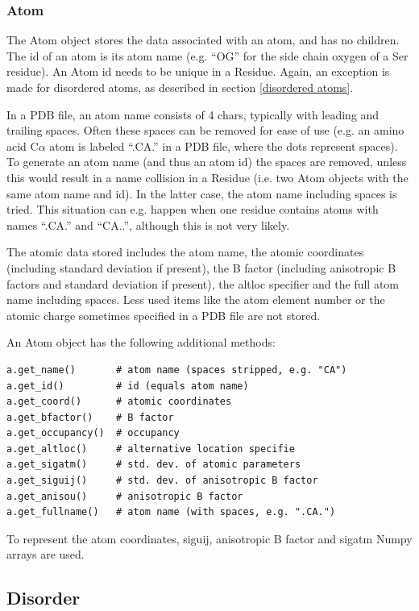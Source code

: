 \documentclass{report}
\begin{document}
\subsubsection{Atom}

The Atom object stores the data associated with an atom, and has no children.
The id of an atom is its atom name (e.g. {}``OG{}'' for the side chain oxygen
of a Ser residue). An Atom id needs to be unique in a Residue. Again, an exception
is made for disordered atoms, as described in section \ref{disordered atoms}.

In a PDB file, an atom name consists of 4 chars, typically with leading and
trailing spaces. Often these spaces can be removed for ease of use (e.g. an
amino acid C\( \alpha  \) atom is labeled {}``.CA.{}'' in a PDB file, where
the dots represent spaces). To generate an atom name (and thus an atom id) the
spaces are removed, unless this would result in a name collision in a Residue
(i.e. two Atom objects with the same atom name and id). In the latter case,
the atom name including spaces is tried. This situation can e.g. happen when
one residue contains atoms with names {}``.CA.{}'' and {}``CA..{}'', although
this is not very likely.

The atomic data stored includes the atom name, the atomic coordinates (including
standard deviation if present), the B factor (including anisotropic B factors
and standard deviation if present), the altloc specifier and the full atom name
including spaces. Less used items like the atom element number or the atomic
charge sometimes specified in a PDB file are not stored.

An Atom object has the following additional methods:

\begin{verbatim}
a.get_name()       # atom name (spaces stripped, e.g. "CA")
a.get_id()         # id (equals atom name)
a.get_coord()      # atomic coordinates
a.get_bfactor()    # B factor
a.get_occupancy()  # occupancy
a.get_altloc()     # alternative location specifie
a.get_sigatm()     # std. dev. of atomic parameters
a.get_siguij()     # std. dev. of anisotropic B factor
a.get_anisou()     # anisotropic B factor
a.get_fullname()   # atom name (with spaces, e.g. ".CA.")
\end{verbatim}

To represent the atom coordinates, siguij, anisotropic B factor and sigatm Numpy
arrays are used.

\subsection{Disorder}
\end{document}

